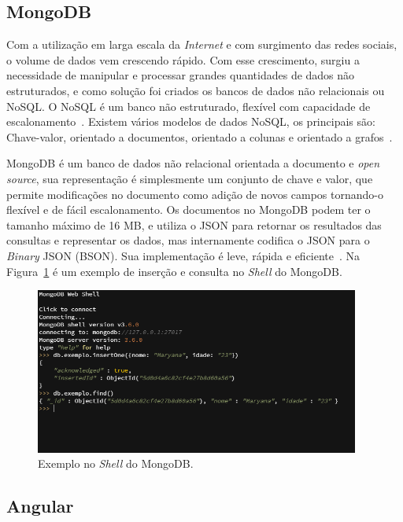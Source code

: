 \subsection{MongoDB}\label{mongo}
\indent

Com a utilização em larga escala da \textit{Internet} e com surgimento das redes sociais, o volume de dados vem crescendo rápido.
Com esse crescimento, surgiu a necessidade de manipular e processar grandes quantidades de dados não estruturados, e como solução foi criados os bancos de dados não relacionais ou \acf{NoSQL}. 
O \ac{NoSQL} é um banco não estruturado, flexível com capacidade de escalonamento~\citep{santana2019nosql}. 
Existem vários modelos de dados \ac{NoSQL}, os principais são: Chave-valor, orientado a documentos, orientado a colunas e orientado a grafos~\citep{santana2019nosql}.

MongoDB é um banco de dados não relacional orientada a documento e \textit{open source}, sua representação é simplesmente um conjunto de chave e valor, que permite modificações no documento como adição de novos campos tornando-o flexível e de fácil escalonamento. Os documentos no MongoDB podem ter o tamanho máximo de 16 MB, e utiliza o \acf{JSON} para retornar os resultados das consultas e representar os dados, mas internamente codifica o \ac{JSON} para o \textit{Binary} JSON (BSON). Sua implementação é leve, rápida e eficiente~\citep{mongodb}.
Na Figura~\ref{fig:shell-mongo} é um exemplo de inserção e consulta no \textit{Shell} do MongoDB.

\begin{figure}[H]
    \centering
    \includegraphics[width=0.95\textwidth]{img/codigo_mongo.PNG}
    \caption[Exemplo no \textit{Shell} do MongoDB]{Exemplo no \textit{Shell} do MongoDB.}
    \label{fig:shell-mongo}
\end{figure}

\subsection{Angular}\label{angular}
\indent

